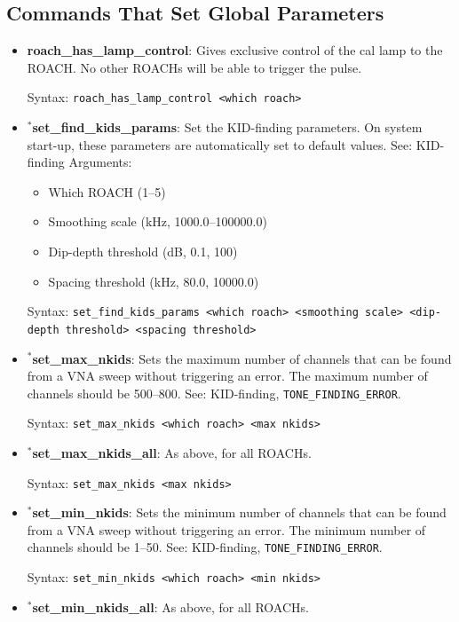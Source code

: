 \subsection{Commands That Set Global Parameters}
\begin{itemize}[leftmargin=*,label={}]

\item \textbf{roach\_has\_lamp\_control}: Gives exclusive control of the cal lamp to the ROACH\@. No other ROACHs will be able to trigger the pulse.

Syntax: \texttt{roach\_has\_lamp\_control <which roach>}

\item $^{*}$\textbf{set\_find\_kids\_params}: Set the KID-finding parameters. On system start-up, these parameters are automatically set to default values. See: KID-finding
Arguments:
\begin{itemize}
  \item Which ROACH (1--5)
  \item Smoothing scale (kHz, 1000.0--100000.0)
  \item Dip-depth threshold (dB, 0.1, 100)
  \item Spacing threshold (kHz, 80.0, 10000.0)
\end{itemize}

Syntax: \texttt{set\_find\_kids\_params <which roach> <smoothing scale> <dip-depth threshold> <spacing threshold>}

\item $^{*}$\textbf{set\_max\_nkids}: Sets the maximum number of channels that can be found from a VNA sweep without triggering an error. The maximum number of channels should be 500--800. See: KID-finding, \texttt{TONE\_FINDING\_ERROR}.

Syntax: \texttt{set\_max\_nkids <which roach> <max nkids>}

\item $^{*}$\textbf{set\_max\_nkids\_all}: As above, for all ROACHs.

Syntax: \texttt{set\_max\_nkids <max nkids>}

\item $^{*}$\textbf{set\_min\_nkids}: Sets the minimum number of channels that can be found from a VNA sweep without triggering an error. The minimum number of channels should be 1--50. See: KID-finding, \texttt{TONE\_FINDING\_ERROR}.

Syntax: \texttt{set\_min\_nkids <which roach> <min nkids>}

\item $^{*}$\textbf{set\_min\_nkids\_all}: As above, for all ROACHs.


\end{itemize}
